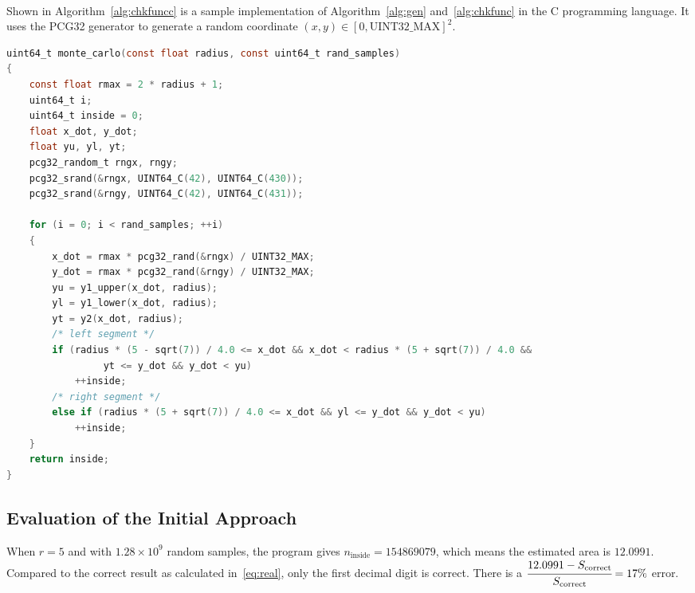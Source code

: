 \documentclass[a4paper]{article}
\begin{document}
\begin{algorithm}[hp]
    \caption{Point checking based on standard equation}\label{alg:chkfunc}
    \begin{algorithmic}[1]
                \State{}
                \State{}
            \EndIf{}\\
            \State{}
        \EndProcedure{}
    \end{algorithmic}
\end{algorithm}

Shown in Algorithm~\ref{alg:chkfuncc} is a sample implementation of Algorithm~\ref{alg:gen} and~\ref{alg:chkfunc} in the C programming language. It uses the PCG32 generator to generate a random coordinate \((x, y) \in {[0, \text{UINT32\_MAX}]}^2\).

\begin{algorithm}[hp]
    \caption{Point checking based on standard equation --- C implementation}\label{alg:chkfuncc}
    \begin{lstlisting}[language=C]
uint64_t monte_carlo(const float radius, const uint64_t rand_samples)
{
    const float rmax = 2 * radius + 1;
    uint64_t i;
    uint64_t inside = 0;
    float x_dot, y_dot;
    float yu, yl, yt;
    pcg32_random_t rngx, rngy;
    pcg32_srand(&rngx, UINT64_C(42), UINT64_C(430));
    pcg32_srand(&rngy, UINT64_C(42), UINT64_C(431));

    for (i = 0; i < rand_samples; ++i)
    {
        x_dot = rmax * pcg32_rand(&rngx) / UINT32_MAX;
        y_dot = rmax * pcg32_rand(&rngy) / UINT32_MAX;
        yu = y1_upper(x_dot, radius);
        yl = y1_lower(x_dot, radius);
        yt = y2(x_dot, radius);
        /* left segment */
        if (radius * (5 - sqrt(7)) / 4.0 <= x_dot && x_dot < radius * (5 + sqrt(7)) / 4.0 &&
                 yt <= y_dot && y_dot < yu)
            ++inside;
        /* right segment */
        else if (radius * (5 + sqrt(7)) / 4.0 <= x_dot && yl <= y_dot && y_dot < yu)
            ++inside;
    }
    return inside;
}
    \end{lstlisting}
\end{algorithm}

\subsection{Evaluation of the Initial Approach}
When \(r = 5\) and with \(1.28\times 10^9\) random samples, the program gives \(n_\text{inside} = 154869079\), which means the estimated area is \(12.0991\). Compared to the correct result as calculated in~\eqref{eq:real}, only the first decimal digit is correct. There is a \(\cfrac{12.0991 - S_\text{correct}}{S_\text{correct}} = 17\% \) error.
\end{document}
